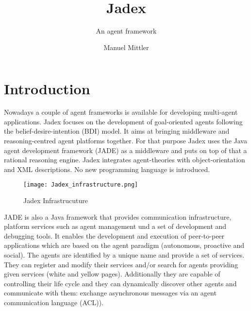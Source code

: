 \documentclass{llncs}
\title{Jadex}
\subtitle{An agent framework}
\author{Manuel Mittler}
\institute{University Koblenz-Landau}
\begin{document}
\maketitle
\tableofcontents

\section{Introduction}
Nowadays a couple of agent frameworks is available for developing multi-agent applications. \cite{Mangina} Jadex focuses on the development of goal-oriented agents following the belief-desire-intention (BDI) model. It aims at bringing middleware and reasoning-centred agent platforms together. For that purpose Jadex uses the Java agent development framework (JADE) as a middleware and puts on top of that a rational reasoning engine. Jadex integrates agent-theories with object-orientation and XML descriptions. No new programming language is introduced. 
\begin{figure}
	\centering
	\texttt{[image: Jadex\_infrastructure.png]}
	\caption{Jadex Infrastrucuture}
	\label{fig1}
\end{figure}
JADE is also a Java framework that provides communication infrastructure, platform services such as agent management und a set of development and debugging tools. It enables the development and execution of  peer-to-peer applications which are based on the agent paradigm (autonomous, proactive and social). The agents are identified by a unique name and provide a set of 
services. They can register and modify their services 
and/or search for agents providing given services (white and yellow pages). Additionally they are capable of controlling their life cycle and they can dynamically discover other agents and communicate 
with them: exchange asynchronous messages via an agent communication language (ACL)). 
\end{document}

